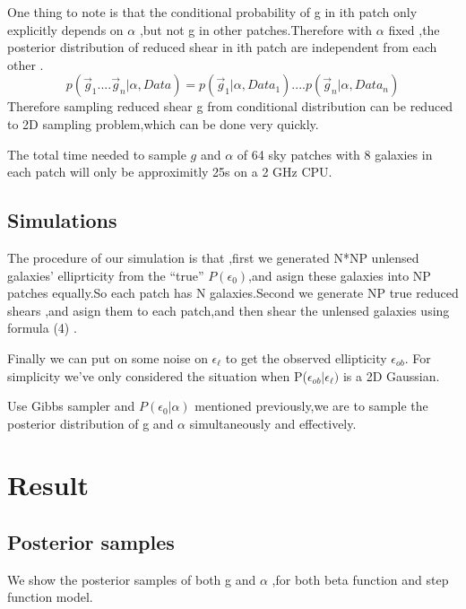 \documentclass[useAMS,usenatbib]{mn2e}
\begin{document}
One thing to note is that the conditional probability of g in ith
patch only explicitly depends on $\alpha$ ,but not g in other patches.Therefore
with $\alpha$ fixed ,the posterior distribution of reduced shear
in ith patch are independent from each other .
\begin{equation}
p(\vec{g}_{1}....\vec{g}_{n}|\alpha,Data)=p(\vec{g}_{1}|\alpha,Data_{1})....p(\vec{g}_{n}|\alpha,Data_{n})
\end{equation}
Therefore sampling reduced shear g from conditional distribution can
be reduced to 2D sampling problem,which can be done very quickly.

The total time needed to sample $g$ and $\alpha$ of 64 sky patches
with 8 galaxies in each patch will only be approximitly 25s on a 2
GHz CPU.


\subsection{Simulations}

The procedure of our simulation is that ,first we generated N{*}NP
unlensed galaxies' elliprticity from the ``true'' $P(\epsilon_{0})$,and
asign these galaxies into NP patches equally.So each patch has N galaxies.Second
we generate NP true reduced shears ,and asign them to each patch,and
then shear the unlensed galaxies using formula (4) .

Finally we can put on some noise on $\epsilon_{\ell}$ to get the
observed ellipticity $\epsilon_{ob}$. For simplicity we've only considered
the situation when P($\epsilon_{ob}|\epsilon_{\ell})$ is a 2D Gaussian.

Use Gibbs sampler and $P(\epsilon_{0}|\alpha)$ mentioned previously,we
are to sample the posterior distribution of g and $\alpha$ simultaneously
and effectively.




\section{Result}
\label{sec:XXX}

\subsection{Posterior samples}
We show the posterior samples of both g and $\alpha$ ,for both beta function and step function model.
\end{document}

